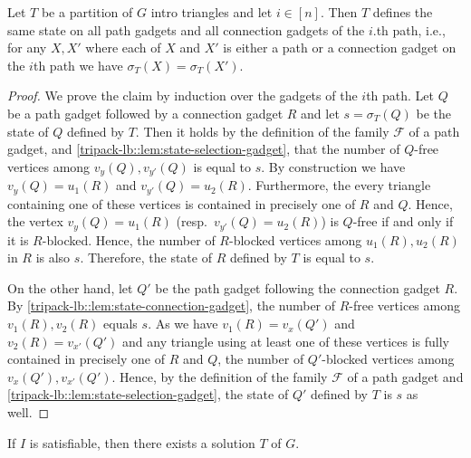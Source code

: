 \documentclass[a4paper,UKenglish,cleveref, autoref, thm-restate]{lipics-v2021}
\begin{document}
\begin{lemma}\label{tripack-lb::lem:same-state-on-path}
    Let $T$ be a partition of $G$ intro triangles and let $i \in [n]$. Then $T$ defines the same state on all path gadgets and all connection gadgets of the $i$.th path, i.e., for any $X, X'$ where each of $X$ and $X'$ is either a path or a connection gadget on the $i$th path we have $\sigma_T(X) = \sigma_T(X')$.
\end{lemma}

\begin{proof}
    We prove the claim by induction over the gadgets of the $i$th path.
    Let $Q$ be a path gadget followed by a connection gadget $R$ and let $s = \sigma_T(Q)$ be the state of $Q$ defined by $T$. 
    Then 
    it holds by the definition of the family $\mathcal{F}$ of a path gadget, and \cref{tripack-lb::lem:state-selection-gadget}, that the number of $Q$-free vertices among $v_y(Q), v_{y'}(Q)$ is equal to $s$. 
    By construction we have $v_y(Q) = u_1(R)$ and $v_{y'}(Q) = u_2(R)$.
    Furthermore, the every triangle containing one of these vertices is contained in precisely one of $R$ and $Q$.
    Hence, the vertex $v_y(Q) = u_1(R)$ (resp.\ $v_{y'}(Q) = u_2(R)$) is $Q$-free if and only if it is $R$-blocked.
    Hence, the number of $R$-blocked vertices among $u_1(R), u_2(R)$ in $R$ is also $s$. 
    Therefore, the state of $R$ defined by $T$ is equal to $s$.

    On the other hand, let $Q'$ be the path gadget following the connection gadget $R$. 
    By \cref{tripack-lb::lem:state-connection-gadget}, the number of $R$-free vertices among $v_1(R), v_2(R)$ equals $s$.
    As we have $v_1(R) = v_{x}(Q')$ and $v_2(R) = v_{x'}(Q')$ and any triangle using at least one of these vertices is fully contained in precisely one of $R$ and $Q$, the number of $Q'$-blocked vertices among $v_x(Q'), v_{x'}(Q')$. 
    Hence, by the definition of the family $\mathcal{F}$ of a path gadget and \cref{tripack-lb::lem:state-selection-gadget}, the state of $Q'$ defined by $T$ is $s$ as well.
\end{proof}

\begin{lemma}
    If $I$ is satisfiable, then there exists a solution $T$ of $G$.
\end{lemma}
\end{document}
